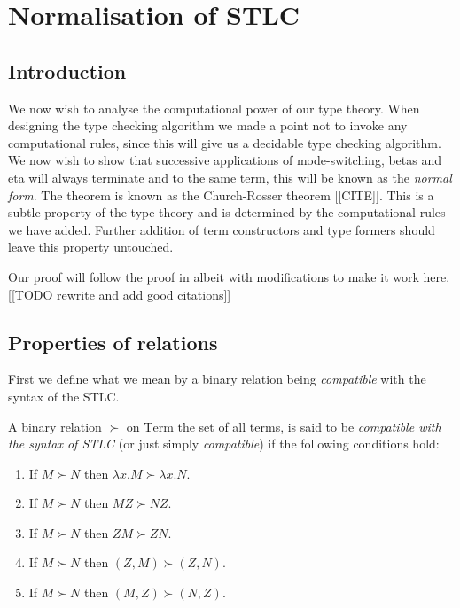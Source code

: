 \section{Normalisation of STLC}


\subsection{Introduction}
We now wish to analyse the computational power of our type theory. When designing the type checking algorithm we made a point not to invoke any computational rules, since this will give us a decidable type checking algorithm. We now wish to show that successive applications of mode-switching, betas and eta will always terminate and to the same term, this will be known as the \emph{normal form}. The theorem is known as the Church-Rosser theorem [[CITE]]. This is a subtle property of the type theory and is determined by the computational rules we have added. Further addition of term constructors and type formers should leave this property untouched.

Our proof will follow the proof in \cite[p. 67]{Sorensen} albeit with modifications to make it work here. [[TODO rewrite and add good citations]]

\subsection{Properties of relations}

First we define what we mean by a binary relation being \emph{compatible} with the syntax of the STLC.
\begin{defin}
    A binary relation $\succ$ on $\mathrm{Term}$ the set of all terms, is said to be \emph{compatible with the syntax of STLC} (or just simply \emph{compatible}) if the following conditions hold:
    \begin{enumerate}
        \item If $M \succ N$ then $\lambda x . M \succ \lambda x . N$.
        \item If $M \succ N$ then $M Z \succ N Z$.
        \item If $M \succ N$ then $Z M \succ Z N$.
        \item If $M \succ N$ then $(Z,M) \succ (Z,N)$.
        \item If $M \succ N$ then $(M, Z) \succ (N, Z)$.
    \end{enumerate}
\end{defin}

